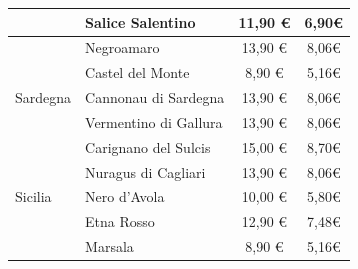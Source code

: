 \documentclass[12pt, a4paper]{article}
\begin{document}
\begin{longtable}{@{}|l|l|c|c|}
& Salice Salentino                                                          & 11,90 €                                                         & 6,90€                                                                                 \\ \hline
& Negroamaro                                                                & 13,90 €                                                         & 8,06€                                                                                 \\ \hline
& Castel del Monte                                                          & 8,90 €                                                          & 5,16€                                                                                 \\ \hline
Sardegna             & Cannonau di Sardegna                                                      & 13,90 €                                                         & 8,06€                                                                                 \\ \hline
& Vermentino di Gallura                                                     & 13,90 €                                                         & 8,06€                                                                                 \\ \hline
& Carignano del Sulcis                                                      & 15,00 €                                                         & 8,70€                                                                                 \\ \hline
& Nuragus di Cagliari                                                       & 13,90 €                                                         & 8,06€                                                                                 \\ \hline
Sicilia              & Nero d'Avola                                                              & 10,00 €                                                         & 5,80€                                                                                 \\ \hline
& Etna Rosso                                                                & 12,90 €                                                         & 7,48€                                                                                 \\ \hline
& Marsala                                                                   & 8,90 €                                                          & 5,16€                                                                                 \\ \hline

\end{longtable}
\end{document}
